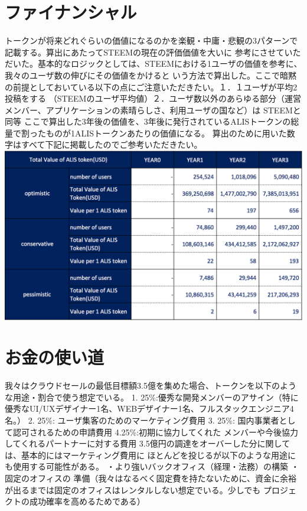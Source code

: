 \documentclass{jsarticle}
\begin{document}
\section{ファイナンシャル}
トークンが将来どれぐらいの価値になるのかを楽観・中庸・悲観の3パターンで記載する。算出にあたってSTEEMの現在の評価価値を大いに
参考にさせていただいた。基本的なロジックとしては、STEEMにおける1ユーザの価値を参考に、我々のユーザ数の伸びにその価値をかけると
いう方法で算出した。ここで暗黙の前提としておいている以下の点にご注意いただきたい。１．１ユーザが平均2投稿をする
（STEEMのユーザ平均値）２．ユーザ数以外のあらゆる部分（運営メンバー、アプリケーションの素晴らしさ、利用ユーザの国など）は
STEEMと同等 ここで算出した3年後の価値を、3年後に発行されているALISトークンの総量で割ったものが1ALISトークンあたりの価値になる。
算出のために用いた数字はすべて下記に掲載したのでご参考いただきたい。
	\includegraphics[scale=0.6]{img/financialtable.png}
\section{お金の使い道}
我々はクラウドセールの最低目標額3.5億を集めた場合、トークンを以下のような用途・割合で使う想定でいる。
1. 25\%:優秀な開発メンバーのアサイン（特に優秀なUI/UXデザイナー1名、WEBデザイナー1名、フルスタックエンジニア4名。）
2. 25\%: ユーザ集客のためのマーケティング費用 3. 25\%: 国内事業者として認可されるための申請費用 4.25\%:初期に協力してくれた
メンバーや今後協力してくれるパートナーに対する費用 3.5億円の調達をオーバーした分に関しては、基本的にはマーケティング費用に
ほとんどを投じるが以下のような用途にも使用する可能性がある。 ・より強いバックオフィス（経理・法務）の構築 ・固定のオフィスの
準備（我々はなるべく固定費を持たないために、資金に余裕が出るまでは固定のオフィスはレンタルしない想定でいる。少しでも
プロジェクトの成功確率を高めるためである）
\end{document}
